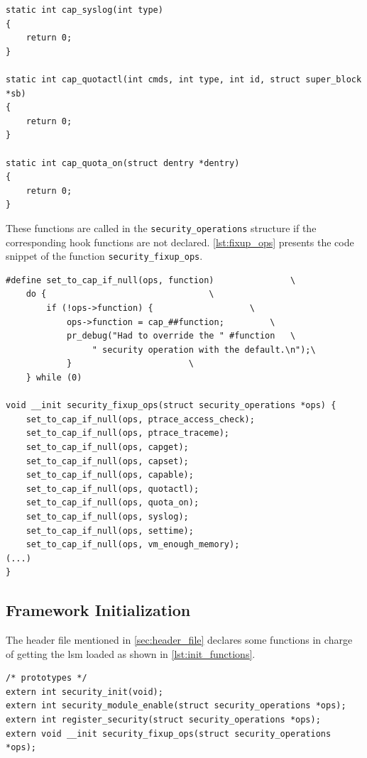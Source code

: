 \begin{lstlisting}[caption=Code snippet of capability functions (Linux kernel v3.11), label=lst:cap_hooks]
static int cap_syslog(int type)
{
	return 0;
}

static int cap_quotactl(int cmds, int type, int id, struct super_block *sb)
{
	return 0;
}

static int cap_quota_on(struct dentry *dentry)
{
	return 0;
}
\end{lstlisting}

These functions are called in the \texttt{security\_operations} structure if the corresponding hook functions are not declared. \autoref{lst:fixup_ops} presents the code snippet of the function \texttt{security\_fixup\_ops}.

\begin{lstlisting}[caption=Code snippet of the \texttt{security\_fixup\_ops()} function (Linux kernel v3.11), label=lst:fixup_ops]
#define set_to_cap_if_null(ops, function)				\
	do {								\
		if (!ops->function) {					\
			ops->function = cap_##function;			\
			pr_debug("Had to override the " #function	\
				 " security operation with the default.\n");\
			}						\
	} while (0)

void __init security_fixup_ops(struct security_operations *ops) {
	set_to_cap_if_null(ops, ptrace_access_check);
	set_to_cap_if_null(ops, ptrace_traceme);
	set_to_cap_if_null(ops, capget);
	set_to_cap_if_null(ops, capset);
	set_to_cap_if_null(ops, capable);
	set_to_cap_if_null(ops, quotactl);
	set_to_cap_if_null(ops, quota_on);
	set_to_cap_if_null(ops, syslog);
	set_to_cap_if_null(ops, settime);
	set_to_cap_if_null(ops, vm_enough_memory);
(...)
}
\end{lstlisting}

\subsection{Framework Initialization}
\label{sec:framework_initialization}

The header file mentioned in \autoref{sec:header_file} declares some functions in charge of getting the \gls{lsm} loaded as shown in \autoref{lst:init_functions}.

\begin{lstlisting}[caption=Code snippet of the initialization functions (Linux kernel v3.11), label=lst:init_functions]
/* prototypes */
extern int security_init(void);
extern int security_module_enable(struct security_operations *ops);
extern int register_security(struct security_operations *ops);
extern void __init security_fixup_ops(struct security_operations *ops);
\end{lstlisting}

